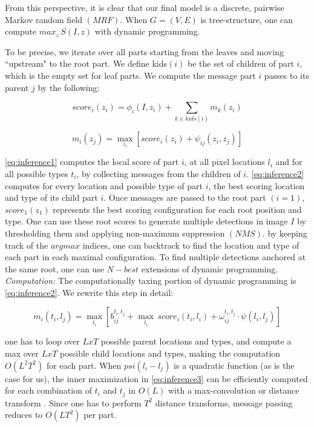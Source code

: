 From this perspective, it is clear that our final model is a discrete, pairwise Markov
random field $(MRF)$. When $G=(V,E)$ is tree-structure, one can compute $max_z\, S(I,z)$ 
with dynamic programming.

To be precise, we iterate over all parts starting from the leaves and moving ``upstream"
to the root part. We define kids$(i)$ be the set of children of part $i$, which is
the empty set for leaf parts. We compute the message part $i$ passes to its parent $j$
by the following:

\begin{equation}
\label{eq:inference1}
score_i(z_i)=\phi_i(I,z_i) + \sum_{k\in kids(i)} m_k(z_i)
\end{equation}

\begin{equation}
\label{eq:inference2}
m_i(z_j)=\max\limits_{z_i}\left[score_i(z_i) + \psi_{ij}(z_i,z_j)\right]
\end{equation}

\ref{eq:inference1} computes the local score of part $i$, at all pixel locations $l_i$ 
and for all possible types $t_i$, by collecting messages from the children of $i$. 
\ref{eq:inference2} computes for every location and possible type of part $i$, the
best scoring location and type of its child part $i$. Once messages are passed to the 
root part $(i=1)$, $score_1(z_1)$ represents the best scoring configuration for each 
root position and type. One can use these root scores to generate multiple detections in
 image $I$ by thresholding them and applying non-maximum suppression $(NMS)$. by keeping 
 track of the $argmax$ indices, one can backtrack to find the location and type of each 
 part in each maximal configuration. To find multiple detections anchored at the same 
 root, one can use $N-best$ extensions of dynamic programming.
\textit{Computation:} The computationally taxing portion of dynamic programming is 
\ref{eq:inference2}. We rewrite this step in detail:

\begin{equation}
\label{eq:inference3}
m_i(t_i, l_j) = \max\limits_{t_i}\left[b_{ij}^{t_i,t_j}+ \max\limits_{l_i}\, score_i(t_i,l_i)+\omega_{ij}^{t_i,t_j} \cdot \psi(l_i,l_j)\right] 
\end{equation}

one has to loop over $LxT$ possible parent locations and types, and compute a max 
over $LxT$ possible child locations and types, making the computation $O(L^2T^2)$ 
for each part. When $psi(l_i-l_j)$ is a quadratic function (as is the case for us), 
the inner maximization in \ref{eq:inference3} can be efficiently computed for each
combination of $t_i$ and $t_j$ in $O(L)$ with a max-convolution or distance transform
\citep{Felzenszwalb2005}. Since one has to perform $T^2$ distance transforms, message passing
reduces to $O(LT^2)$ per part.



